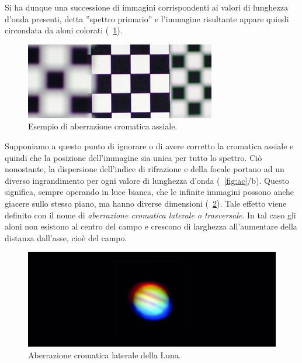 \begin{itemize}
Si ha dunque una successione di immagini corrispondenti ai valori di lunghezza d'onda presenti, detta ''spettro primario'' e l'immagine risultante appare quindi circondata da aloni colorati (\figurename~\ref{fig:aca}).\\

\begin{figure}[!ht]
 \centering
 \includegraphics[scale=.65]{img/CAP2aca.jpg}
 \caption{\small{Esempio di aberrazione cromatica assiale.}}
 \label{fig:aca}
\end{figure}

Supponiamo a questo punto di ignorare o di avere corretto la cromatica assiale e quindi che la posizione dell'immagine sia unica per tutto lo spettro. Ciò nonostante, la dispersione dell'indice di rifrazione e della focale portano ad un diverso ingrandimento per ogni valore di lunghezza d'onda (\figurename~\ref{fig:ac}/b). Questo significa, sempre operando in luce bianca, che le infinite immagini possono anche giacere sullo stesso piano, ma hanno diverse dimensioni (\figurename~\ref{fig:acl}). Tale effetto viene definito con il nome di \textit{aberrazione cromatica laterale o trasversale}. In tal caso gli aloni non esistono al centro del campo e crescono di larghezza all'aumentare della distanza dall'asse, cioè del campo. \\

\begin{figure}[!ht]
 \centering
 \includegraphics[scale=.30]{img/CAP2acl.jpg}
 \caption{\small{Aberrazione cromatica laterale della Luna.}}
 \label{fig:acl}
\end{figure}


\end{itemize}

